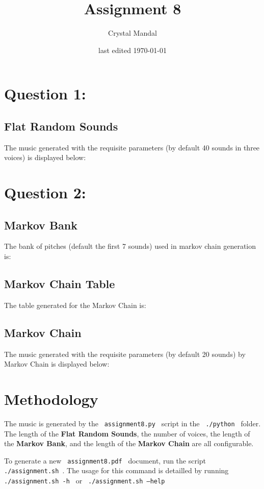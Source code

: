 \documentclass[12pt,letterpaper]{article}
\title{Assignment 8}
\author{Crystal Mandal}
\date{last edited \today}
\newcommand{\code}[1]{\colorbox{light-gray}{\texttt{#1}}}
\begin{document}
\maketitle

\section{Question 1:}
\subsection{Flat Random Sounds}
The music generated with the requisite parameters (by default 40 sounds in 
three voices) is displayed below:


\section{Question 2:}
\subsection{Markov Bank}
The bank of pitches (default the first 7 sounds) used in markov chain generation is:


\subsection{Markov Chain Table}
The table generated for the Markov Chain is:


\subsection{Markov Chain}
The music generated with the requisite parameters (by default 20 sounds) 
by Markov Chain is displayed below:


\section{Methodology}
The music is generated by the \code{ assignment8.py } script in the 
\code{ ./python } folder. The length of the \textbf{Flat Random Sounds}, 
the number of voices, the length of the \textbf{Markov Bank}, and the 
length of the \textbf{Markov Chain} are all configurable. 

To generate a new \code{ assignment8.pdf } document, run the script 
\code{ ./assignment.sh  }. The usage for this command is detailled 
by running \code{ ./assignment.sh -h  } or \code { ./assignment.sh --help  }
\end{document}
